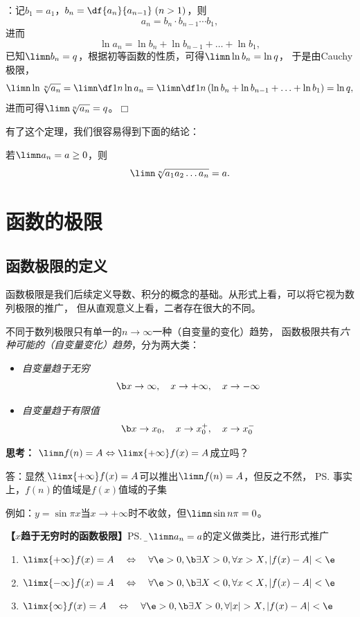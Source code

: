 \begin{shaded}
[证]：记$b_1=a_1$，$b_n=\df{a_n}{a_{n-1}}\;(n>1)$，则
$$a_n=b_n\cdot b_{n-1}\cdots b_1,$$
进而
$$\ln a_n=\ln b_n+\ln b_{n-1}+\ldots+\ln b_1,$$
已知$\limn b_n=q$，根据初等函数的性质，可得$\limn\ln b_n=\ln q$，
于是由Cauchy极限，
$$\limn\ln \sqrt[n]{a_n}=\limn\df1n\ln a_n=\limn\df1n\left(
\ln b_n+\ln b_{n-1}+\ldots+\ln b_1\right)=\ln q,$$
进而可得$\limn\sqrt[n]{a_n}=q$。\hfill$\Box$

有了这个定理，我们很容易得到下面的结论：

\begin{tcolorbox}
	若$\limn a_n=a\geq 0$，则
	$$\limn\sqrt[n]{a_1a_2\ldots a_n}=a.$$
\end{tcolorbox}

\end{shaded}

\section{函数的极限}

\subsection{函数极限的定义}

函数极限是我们后续定义导数、积分的概念的基础。从形式上看，可以将它视为数列极限的推广，
但从直观意义上看，二者存在很大的不同。

不同于数列极限只有单一的$n\to\infty$一种（自变量的变化）趋势，
函数极限共有{\it 六种可能的（自变量变化）趋势}，分为两大类：

\begin{itemize}
  \setlength{\itemindent}{1cm}
  \item {\it 自变量趋于无穷}
  $$\b x\to\infty,\quad x\to+\infty,\quad x\to-\infty$$
  \item {\it 自变量趋于有限值}
  $$\b x\to x_0,\quad x\to x_0^+,\quad x\to x_0^-$$
\end{itemize}

{\bf 思考：} $\limn f(n)=A\Leftrightarrow\limx{+\infty}f(x)=A$成立吗？

答：显然，{\b$\limx{+\infty}f(x)=A$可以推出$\limn f(n)=A$，但反之不然}，
\ps{事实上，$f(n)$的值域是$f(x)$值域的子集}

例如：$y=\sin\pi x$当$x\to+\infty$时不收敛，但$\limn\sin n\pi=0$。

{\bf 【$x$趋于无穷时的函数极限】}\ps{\b 和$\limn a_n=a$的定义做类比，进行形式推广}
\begin{thx}
	\begin{enumerate}%
	  \item $\limx{+\infty}f(x)=A\quad\Leftrightarrow\quad
	  \forall \e>0,{\b\exists X>0,\forall x>X},|f(x)-A|<\e$
	  \item $\limx{-\infty}f(x)=A\quad\Leftrightarrow\quad
	  \forall \e>0,{\b\exists X<0,\forall x<X},|f(x)-A|<\e$
	  \item $\limx{\infty}f(x)=A\quad\Leftrightarrow\quad
	  \forall \e>0,{\b\exists X>0,\forall |x|>X},|f(x)-A|<\e$
	\end{enumerate}
\end{thx}



